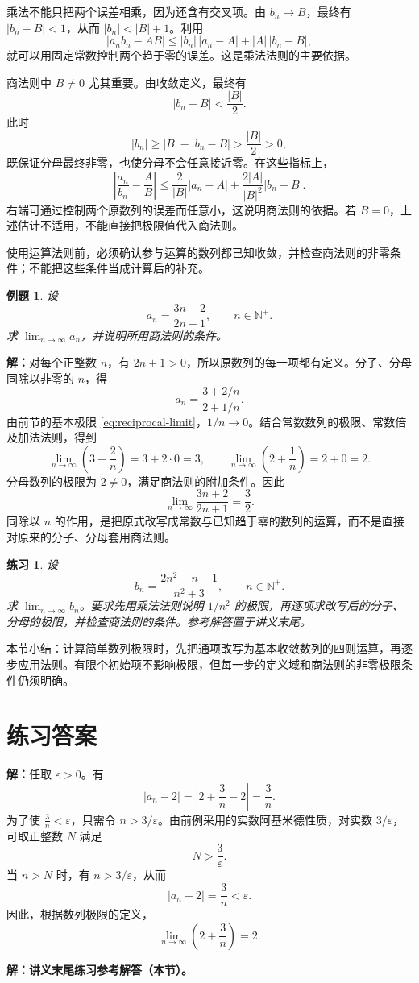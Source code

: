 \documentclass[UTF8,fontset=fandol,11pt]{ctexart}
\newtheorem{example}[definition]{例题}
\newtheorem{exercise}[definition]{练习}
\begin{document}
乘法不能只把两个误差相乘，因为还含有交叉项。由 $b_n\to B$，最终有 $|b_n-B|<1$，从而 $|b_n|<|B|+1$。利用
\[
|a_nb_n-AB|
\leq |b_n|\,|a_n-A|+|A|\,|b_n-B|,
\]
就可以用固定常数控制两个趋于零的误差。这是乘法法则的主要依据。

商法则中 $B\ne0$ 尤其重要。由收敛定义，最终有
\[
|b_n-B|<\frac{|B|}{2}.
\]
此时
\[
|b_n|\geq |B|-|b_n-B|>\frac{|B|}{2}>0,
\]
既保证分母最终非零，也使分母不会任意接近零。在这些指标上，
\[
\left|\frac{a_n}{b_n}-\frac{A}{B}\right|
\leq \frac{2}{|B|}|a_n-A|
+\frac{2|A|}{|B|^2}|b_n-B|.
\]
右端可通过控制两个原数列的误差而任意小，这说明商法则的依据。若 $B=0$，上述估计不适用，不能直接把极限值代入商法则。

使用运算法则前，必须确认参与运算的数列都已知收敛，并检查商法则的非零条件；不能把这些条件当成计算后的补充。\par
\begin{example}
设
\[
a_n=\frac{3n+2}{2n+1},\qquad n\in\mathbb{N}^+.
\]
求 $\lim_{n\to\infty}a_n$，并说明所用商法则的条件。
\end{example}
\par\noindent\textbf{解：}对每个正整数 $n$，有 $2n+1>0$，所以原数列的每一项都有定义。分子、分母同除以非零的 $n$，得
\[
a_n=\frac{3+2/n}{2+1/n}.
\]
由前节的基本极限 \eqref{eq:reciprocal-limit}，$1/n\to0$。结合常数数列的极限、常数倍及加法法则，得到
\[
\lim_{n\to\infty}\left(3+\frac{2}{n}\right)=3+2\cdot0=3,
\qquad
\lim_{n\to\infty}\left(2+\frac{1}{n}\right)=2+0=2.
\]
分母数列的极限为 $2\ne0$，满足商法则的附加条件。因此
\[
\lim_{n\to\infty}\frac{3n+2}{2n+1}=\frac{3}{2}.
\]
同除以 $n$ 的作用，是把原式改写成常数与已知趋于零的数列的运算，而不是直接对原来的分子、分母套用商法则。\par
\begin{exercise}
设
\[
b_n=\frac{2n^2-n+1}{n^2+3},\qquad n\in\mathbb{N}^+.
\]
求 $\lim_{n\to\infty}b_n$。要求先用乘法法则说明 $1/n^2$ 的极限，再逐项求改写后的分子、分母的极限，并检查商法则的条件。参考解答置于讲义末尾。
\end{exercise}
本节小结：计算简单数列极限时，先把通项改写为基本收敛数列的四则运算，再逐步应用法则。有限个初始项不影响极限，但每一步的定义域和商法则的非零极限条件仍须明确。\par
\section*{练习答案}
\par\noindent\textbf{解：}任取 $\varepsilon>0$。有
\[
\left|a_n-2\right|=\left|2+\frac{3}{n}-2\right|=\frac{3}{n}.
\]
为了使 $\frac{3}{n}<\varepsilon$，只需令 $n>3/\varepsilon$。由前例采用的实数阿基米德性质，对实数 $3/\varepsilon$，可取正整数 $N$ 满足
\[
N>\frac{3}{\varepsilon}.
\]
当 $n>N$ 时，有 $n>3/\varepsilon$，从而
\[
\left|a_n-2\right|=\frac{3}{n}<\varepsilon.
\]
因此，根据数列极限的定义，
\[
\lim_{n\to\infty}\left(2+\frac{3}{n}\right)=2.
\]\par
\par\noindent\textbf{解：}\textbf{讲义末尾练习参考解答（本节）。}
\end{document}
